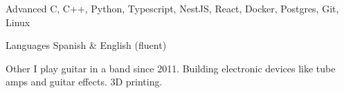 
\begin{cvskills}

  \cvskill
    {Advanced}
    {C, C++, Python, Typescript, NestJS, React, Docker, Postgres, Git, Linux}

  \cvskill
    {Languages}
    {Spanish \& English (fluent)}

  \cvskill
    {Other}
    {I play guitar in a band since 2011. Building electronic devices like tube amps and guitar effects. 3D printing.}

\end{cvskills}
